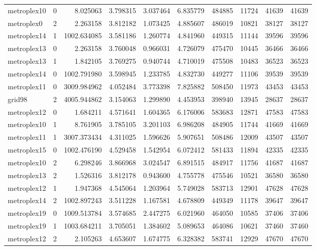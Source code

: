 \begin{longtable}{|l|r|r|r|r|r|r|r|r|r|}
metroplex10 & 0 & 8.025063 & 3.798315 & 3.037464 & 6.835779 & 484885 & 11724 & 41639 & 41639 \\
metroplex0 & 2 & 2.263158 & 3.812182 & 1.073425 & 4.885607 & 486019 & 10821 & 38127 & 38127 \\
metroplex14 & 1 & 1002.634085 & 3.581186 & 1.260774 & 4.841960 & 449315 & 11144 & 39596 & 39596 \\
metroplex13 & 0 & 2.263158 & 3.760048 & 0.966031 & 4.726079 & 475470 & 10445 & 36466 & 36466 \\
metroplex13 & 1 & 1.842105 & 3.769275 & 0.940744 & 4.710019 & 475508 & 10483 & 36523 & 36523 \\
metroplex14 & 0 & 1002.791980 & 3.598945 & 1.233785 & 4.832730 & 449277 & 11106 & 39539 & 39539 \\
metroplex11 & 0 & 3009.984962 & 4.052484 & 3.773398 & 7.825882 & 508450 & 11973 & 43453 & 43453 \\
grid98 & 2 & 4005.944862 & 3.154063 & 1.299890 & 4.453953 & 398940 & 13945 & 28637 & 28637 \\
metroplex12 & 0 & 1.684211 & 4.571641 & 1.604365 & 6.176006 & 583683 & 12871 & 47583 & 47583 \\
metroplex10 & 1 & 8.761905 & 3.785105 & 3.201103 & 6.986208 & 484905 & 11744 & 41669 & 41669 \\
metroplex11 & 1 & 3007.373434 & 4.311025 & 1.596626 & 5.907651 & 508486 & 12009 & 43507 & 43507 \\
metroplex15 & 0 & 1002.476190 & 4.529458 & 1.542954 & 6.072412 & 581433 & 11894 & 42335 & 42335 \\
metroplex10 & 2 & 6.298246 & 3.866968 & 3.024547 & 6.891515 & 484917 & 11756 & 41687 & 41687 \\
metroplex13 & 2 & 1.526316 & 3.812178 & 0.943600 & 4.755778 & 475546 & 10521 & 36580 & 36580 \\
metroplex12 & 1 & 1.947368 & 4.545064 & 1.203964 & 5.749028 & 583713 & 12901 & 47628 & 47628 \\
metroplex14 & 2 & 1002.897243 & 3.511228 & 1.167581 & 4.678809 & 449349 & 11178 & 39647 & 39647 \\
metroplex19 & 0 & 1009.513784 & 3.574685 & 2.447275 & 6.021960 & 464050 & 10585 & 37406 & 37406 \\
metroplex19 & 1 & 1003.684211 & 3.705051 & 1.384602 & 5.089653 & 464086 & 10621 & 37460 & 37460 \\
metroplex12 & 2 & 2.105263 & 4.653607 & 1.674775 & 6.328382 & 583741 & 12929 & 47670 & 47670 \\

\end{longtable}
